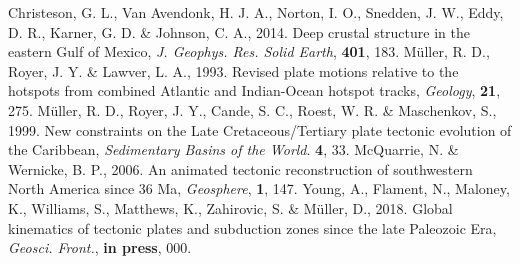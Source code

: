 \begin{thebibliography}{}
  Christeson, G. L., Van Avendonk, H. J. A., Norton, I. O., Snedden, J. W.,
  Eddy, D. R., Karner, G. D. \& Johnson, C. A., 2014. Deep crustal structure in
  the eastern Gulf of Mexico, \textit{J. Geophys. Res. Solid Earth},
  \textbf{401}, 183.
  M{\"{u}}ller, R. D., Royer, J. Y. \& Lawver, L. A., 1993. Revised plate
  motions relative to the hotspots from combined Atlantic and Indian-Ocean
  hotspot tracks, \textit{Geology}, \textbf{21}, 275.
  M{\"{u}}ller, R. D., Royer, J. Y., Cande, S. C., Roest, W. R. \& Maschenkov,
  S., 1999. New constraints on the Late Cretaceous/Tertiary plate tectonic
  evolution of the Caribbean, \textit{Sedimentary Basins of the World}.
  \textbf{4}, 33.
  McQuarrie, N. \& Wernicke, B. P., 2006. An animated tectonic reconstruction of
  southwestern North America since 36 Ma, \textit{Geosphere}, \textbf{1},
  147.
  Young, A., Flament, N., Maloney, K., Williams, S., Matthews, K., Zahirovic,
  S.
  \& Müller, D., 2018. Global kinematics of tectonic plates and subduction zones
  since the late Paleozoic Era, \textit{Geosci. Front.},
  \textbf{in press}, 000.
\end{thebibliography}\label{lastpage}
